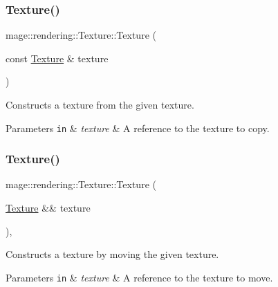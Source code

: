 \subsubsection{\texorpdfstring{Texture()}{Texture()}\hspace{0.1cm}{\footnotesize\ttfamily [3/4]}}
{\footnotesize\ttfamily mage\+::rendering\+::\+Texture\+::\+Texture (\begin{DoxyParamCaption}\item[{const \mbox{\hyperlink{classmage_1_1rendering_1_1_texture}{Texture}} \&}]{texture }\end{DoxyParamCaption})\hspace{0.3cm}{\ttfamily [delete]}}

Constructs a texture from the given texture.


\begin{DoxyParams}[1]{Parameters}
\mbox{\tt in}  & {\em texture} & A reference to the texture to copy. \\
\hline
\end{DoxyParams}
\mbox{\label{classmage_1_1rendering_1_1_texture_a25eb2aa2277478fb5c17af996d509c57}} 
\subsubsection{\texorpdfstring{Texture()}{Texture()}\hspace{0.1cm}{\footnotesize\ttfamily [4/4]}}
{\footnotesize\ttfamily mage\+::rendering\+::\+Texture\+::\+Texture (\begin{DoxyParamCaption}\item[{\mbox{\hyperlink{classmage_1_1rendering_1_1_texture}{Texture}} \&\&}]{texture }\end{DoxyParamCaption})\hspace{0.3cm}{\ttfamily [default]}, {\ttfamily [noexcept]}}

Constructs a texture by moving the given texture.


\begin{DoxyParams}[1]{Parameters}
\mbox{\tt in}  & {\em texture} & A reference to the texture to move. \\
\hline
\end{DoxyParams}
\mbox{\label{classmage_1_1rendering_1_1_texture_af0ca576b1131fc0ac70725127b4fa7e4}} 

